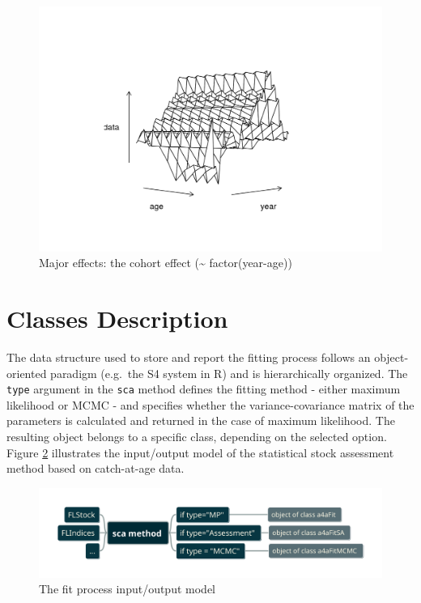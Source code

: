 \documentclass[
]{book}
\begin{document}
\begin{figure}
\centering
\includegraphics{_bookdown_files/_main_files/figure-html/majeffc-1.png}
\caption{\label{fig:majeffc}Major effects: the cohort effect (\textasciitilde{} factor(year-age))}
\end{figure}

\hypertarget{classes-description}{%
\section{\texorpdfstring{Classes Description \label{sec:classes}}{Classes Description }}\label{classes-description}}

The data structure used to store and report the fitting process follows an object-oriented paradigm (e.g.~the S4 system in R) and is hierarchically organized. The \texttt{type} argument in the \texttt{sca} method defines the fitting method - either maximum likelihood or MCMC - and specifies whether the variance-covariance matrix of the parameters is calculated and returned in the case of maximum likelihood. The resulting object belongs to a specific class, depending on the selected option. Figure \ref{fig:iomod} illustrates the input/output model of the statistical stock assessment method based on catch-at-age data.

\begin{figure}

{\centering \includegraphics[width=1.2\linewidth]{figure/scamethod} 

}

\caption{The fit process input/output model}\label{fig:iomod}
\end{figure}
\end{document}
